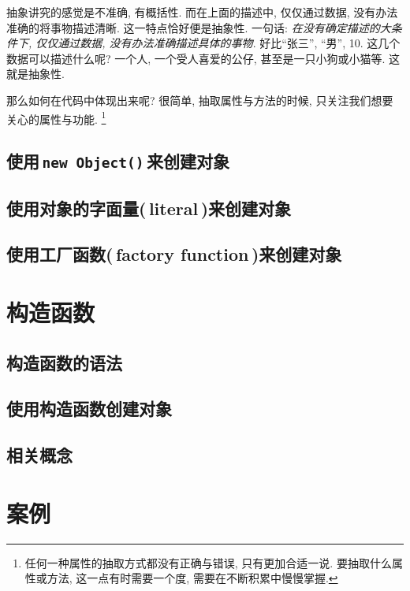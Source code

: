 抽象讲究的感觉是不准确, 有概括性. 而在上面的描述中, 仅仅通过数据, 没有办法准确的将事物描述清晰. 
这一特点恰好便是抽象性. 一句话: \emph{在没有确定描述的大条件下, 仅仅通过数据, 没有办法准确描述具体的事物}. 
好比``张三'', ``男'', 10. 这几个数据可以描述什么呢? 一个人, 一个受人喜爱的公仔, 甚至是一只小狗或小猫等. 
这就是抽象性. 

那么如何在代码中体现出来呢? 很简单, 抽取属性与方法的时候, 只关注我们想要关心的属性与功能. 
\footnote{任何一种属性的抽取方式都没有正确与错误, 只有更加合适一说. 要抽取什么属性或方法, 这一点有时需要一个度, 需要在不断积累中慢慢掌握.}

\subsection{使用\,\lstinline|new Object()|\,来创建对象}

\subsection{使用对象的字面量(\,literal\,)来创建对象}

\subsection{使用工厂函数(\,factory function\,)来创建对象}



\section{构造函数}

\subsection{构造函数的语法}

\subsection{使用构造函数创建对象}

\subsection{相关概念}

\section{案例}
